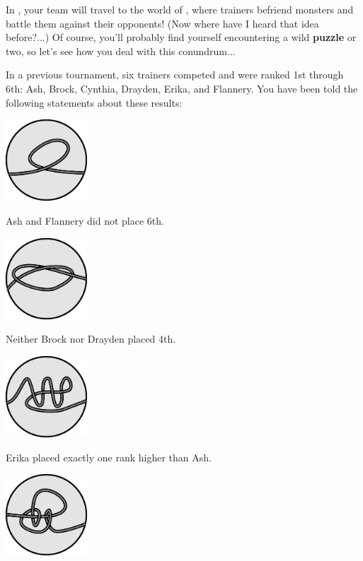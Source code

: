 

In \phEventName{}, your team will travel to the world of
\textbf{\mappMobimon{}}, where trainers befriend monsters and battle them
against their opponents!
(Now where have I heard that idea before?...) Of course, you'll probably
find yourself encountering a wild \textbf{puzzle} or two, so let's see how
you deal with this conundrum...

In a previous \mappMobimon{} tournament, six trainers competed and were
ranked 1st through 6th: Ash, Brock, Cynthia, Drayden, Erika, and Flannery.
You have been told the following statements about these results:

\begin{multicols}{3}\footnotesize
  \begin{center}
    \includegraphics[width=1.2in]{assets/unknot1.pdf}

    Ash and Flannery did not place 6th.


    \includegraphics[width=1.2in]{assets/knot1.pdf}

    Neither Brock nor Drayden placed 4th.


    \includegraphics[width=1.2in]{assets/unknot2.pdf}

    Erika placed exactly one rank higher than Ash.


    \includegraphics[width=1.2in]{assets/knot2.pdf}


\end{center}
\end{multicols}
